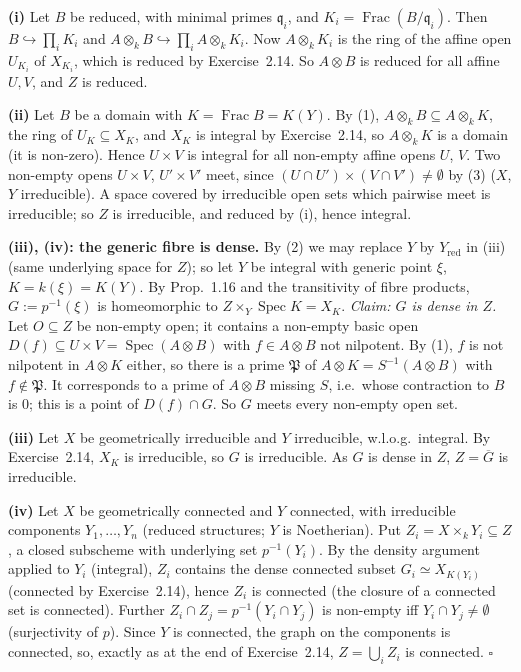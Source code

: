 \documentclass[11pt]{article}
\begin{document}
\textbf{(i)} Let $B$ be reduced, with minimal primes $\mathfrak q_i$, and $K_i=\operatorname{Frac}(B/\mathfrak q_i)$. Then $B\hookrightarrow\prod_iK_i$ and $A\otimes_kB\hookrightarrow\prod_iA\otimes_kK_i$. Now $A\otimes_kK_i$ is the ring of the affine open $U_{K_i}$ of $X_{K_i}$, which is reduced by Exercise~2.14. So $A\otimes B$ is reduced for all affine $U,V$, and $Z$ is reduced.

\textbf{(ii)} Let $B$ be a domain with $K=\operatorname{Frac}B=K(Y)$. By (1), $A\otimes_kB\subseteq A\otimes_kK$, the ring of $U_K\subseteq X_K$, and $X_K$ is integral by Exercise~2.14, so $A\otimes_kK$ is a domain (it is non-zero). Hence $U\times V$ is integral for all non-empty affine opens $U$, $V$. Two non-empty opens $U\times V$, $U'\times V'$ meet, since $(U\cap U')\times(V\cap V')\neq\emptyset$ by (3) ($X$, $Y$ irreducible). A space covered by irreducible open sets which pairwise meet is irreducible; so $Z$ is irreducible, and reduced by (i), hence integral.

\textbf{(iii), (iv): the generic fibre is dense.} By (2) we may replace $Y$ by $Y_{\operatorname{red}}$ in (iii) (same underlying space for $Z$); so let $Y$ be integral with generic point $\xi$, $K=k(\xi)=K(Y)$. By Prop.~1.16 and the transitivity of fibre products, $G:=p^{-1}(\xi)$ is homeomorphic to $Z\times_Y\operatorname{Spec}K=X_K$. \emph{Claim: $G$ is dense in $Z$.} Let $O\subseteq Z$ be non-empty open; it contains a non-empty basic open $D(f)\subseteq U\times V=\operatorname{Spec}(A\otimes B)$ with $f\in A\otimes B$ not nilpotent. By (1), $f$ is not nilpotent in $A\otimes K$ either, so there is a prime $\mathfrak P$ of $A\otimes K=S^{-1}(A\otimes B)$ with $f\notin\mathfrak P$. It corresponds to a prime of $A\otimes B$ missing $S$, i.e.\ whose contraction to $B$ is $0$; this is a point of $D(f)\cap G$. So $G$ meets every non-empty open set.

\textbf{(iii)} Let $X$ be geometrically irreducible and $Y$ irreducible, w.l.o.g.\ integral. By Exercise~2.14, $X_K$ is irreducible, so $G$ is irreducible. As $G$ is dense in $Z$, $Z=\overline G$ is irreducible.

\textbf{(iv)} Let $X$ be geometrically connected and $Y$ connected, with irreducible components $Y_1,\dots,Y_n$ (reduced structures; $Y$ is Noetherian). Put $Z_i=X\times_kY_i\subseteq Z$, a closed subscheme with underlying set $p^{-1}(Y_i)$. By the density argument applied to $Y_i$ (integral), $Z_i$ contains the dense connected subset $G_i\simeq X_{K(Y_i)}$ (connected by Exercise~2.14), hence $Z_i$ is connected (the closure of a connected set is connected). Further $Z_i\cap Z_j=p^{-1}(Y_i\cap Y_j)$ is non-empty iff $Y_i\cap Y_j\neq\emptyset$ (surjectivity of $p$). Since $Y$ is connected, the graph on the components is connected, so, exactly as at the end of Exercise~2.14, $Z=\bigcup_iZ_i$ is connected. \hfill$\square$
\end{document}
